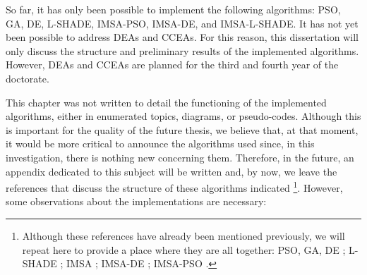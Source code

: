 			So far, it has only been possible to implement the following algorithms: PSO, GA, DE, L-SHADE, IMSA-PSO, IMSA-DE, and IMSA-L-SHADE. It has not yet been possible to address DEAs and CCEAs. For this reason, this dissertation will only discuss the structure and preliminary results of the implemented algorithms. However, DEAs and CCEAs are planned for the third and fourth year of the doctorate.
			
			This chapter was not written to detail the functioning of the implemented algorithms, either in enumerated topics, diagrams, or pseudo-codes. Although this is important for the quality of the future thesis, we believe that, at that moment, it would be more critical to announce the algorithms used since, in this investigation, there is nothing new concerning them. Therefore, in the future, an appendix dedicated to this subject will be written and, by now, we leave the references that discuss the structure of these algorithms indicated \footnote{Although these references have already been mentioned previously, we will repeat here to provide a place where they are all together: PSO, GA, DE \citep{eiben2015introduction,gaspar2012manual,pastorino2010chap7}; L-SHADE \citep{tanabe2013success,tanabe2014improving}; IMSA \citep{caorsi2004detection}; IMSA-DE \citep{donelli2010differential}; IMSA-PSO \citep{salucci2017multifrequency}.}. However, some observations about the implementations are necessary:
			

